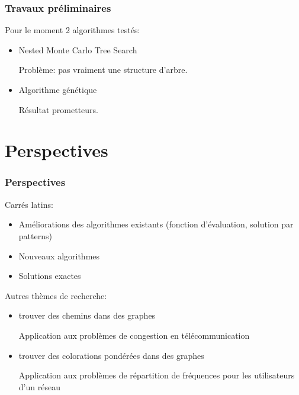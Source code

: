 \documentclass{beamer}
\begin{document}
\begin{frame}
    \frametitle{Travaux préliminaires}
    Pour le moment 2 algorithmes testés:
    \begin{itemize}
        \item Nested Monte Carlo Tree Search

        Problème: pas vraiment une structure d'arbre.
        \item Algorithme génétique

        Résultat prometteurs.
    \end{itemize}
\end{frame}


\section{Perspectives}

\begin{frame}
    \frametitle{Perspectives}
    Carrés latins:
    \begin{itemize}
        \item Améliorations des algorithmes existants (fonction d'évaluation, solution par patterns)
        \item Nouveaux algorithmes
        \item Solutions exactes
    \end{itemize}
    Autres thèmes de recherche:
    \begin{itemize}
        \item trouver des chemins dans des graphes 
        
        Application aux problèmes de congestion en télécommunication
        \item trouver des colorations pondérées dans des graphes 

        Application aux problèmes de répartition de fréquences pour les utilisateurs d'un réseau
    \end{itemize}
\end{frame}
\end{document}
